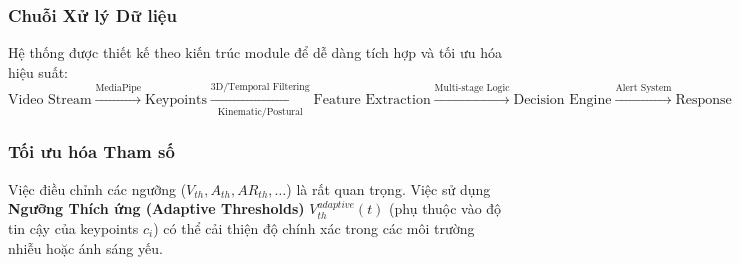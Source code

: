 \subsubsection{Chuỗi Xử lý Dữ liệu}
Hệ thống được thiết kế theo kiến trúc module để dễ dàng tích hợp và tối ưu hóa hiệu suất:
\begin{equation}
\text{Video Stream} \xrightarrow{\text{MediaPipe}} \text{Keypoints} 
\xrightarrow[\text{Kinematic/Postural}]{3\text{D/Temporal Filtering}} \text{Feature Extraction} 
\xrightarrow{\text{Multi-stage Logic}} \text{Decision Engine} 
\xrightarrow{\text{Alert System}} \text{Response}
\end{equation}

\subsubsection{Tối ưu hóa Tham số}
Việc điều chỉnh các ngưỡng ($V_{th}, A_{th}, AR_{th}, \dots$) là rất quan trọng. Việc sử dụng \textbf{Ngưỡng Thích ứng (Adaptive Thresholds)} $V_{th}^{adaptive}(t)$ (phụ thuộc vào độ tin cậy của keypoints $c_i$) có thể cải thiện độ chính xác trong các môi trường nhiễu hoặc ánh sáng yếu.
